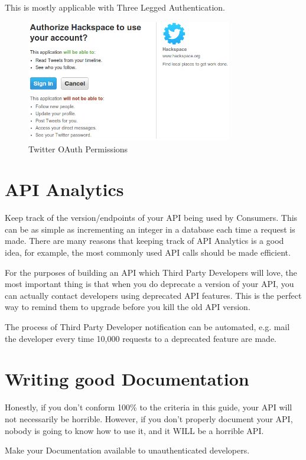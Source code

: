 \documentclass{book}
\begin{document}
This is mostly applicable with Three Legged Authentication.

\begin{figure}[ht!]
\centering
\includegraphics[width=90mm]{images/permissions-twitter.png}
\caption{Twitter OAuth Permissions}
\label{overflow}
\end{figure}


\chapter{API Analytics}

Keep track of the version/endpoints of your API being used by Consumers. This can be as simple as incrementing an integer in a database each time a request is made. There are many reasons that keeping track of API Analytics is a good idea, for example, the most commonly used API calls should be made efficient.

For the purposes of building an API which Third Party Developers will love, the most important thing is that when you do deprecate a version of your API, you can actually contact developers using deprecated API features. This is the perfect way to remind them to upgrade before you kill the old API version.

The process of Third Party Developer notification can be automated, e.g. mail the developer every time 10,000 requests to a deprecated feature are made.


\chapter{Writing good Documentation}

Honestly, if you don't conform 100\% to the criteria in this guide, your API will not necessarily be horrible. However, if you don't properly document your API, nobody is going to know how to use it, and it WILL be a horrible API.

Make your Documentation available to unauthenticated developers.
\end{document}
